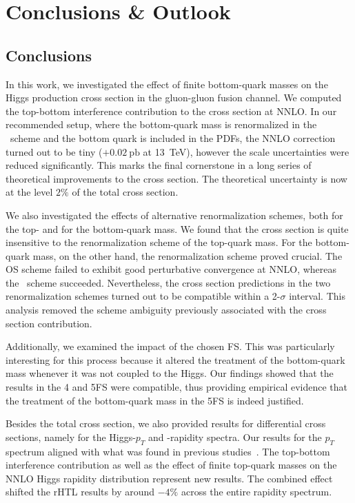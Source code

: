 

\chapter{Conclusions \& Outlook}\label{chap:seven}
\section{Conclusions}
In this work, we investigated the effect of finite bottom-quark masses on the Higgs production cross section in the gluon-gluon fusion channel. We computed the top-bottom interference contribution to the cross section at \acs{NNLO}. In our recommended setup, where the bottom-quark mass is renormalized in the \MS\ scheme and the bottom quark is included in the \acs{PDF}s, the \acs{NNLO} correction turned out to be tiny ($+0.02\ \mathrm{pb}$ at 13~TeV), however the scale uncertainties were reduced significantly. This marks the final cornerstone in a long series of theoretical improvements to the cross section. The theoretical uncertainty is now at the level $2\%$ of the total cross section.

We also investigated the effects of alternative renormalization schemes, both for the top- and for the bottom-quark mass. We found that the cross section is quite insensitive to the renormalization scheme of the top-quark mass. For the bottom-quark mass, on the other hand, the renormalization scheme proved crucial. The \acs{OS} scheme failed to exhibit good perturbative convergence at \acs{NNLO}, whereas the \MS\ scheme succeeded. Nevertheless, the cross section predictions in the two renormalization schemes turned out to be compatible within a 2-$\sigma$ interval. This analysis removed the scheme ambiguity previously associated with the cross section contribution.

Additionally, we examined the impact of the chosen \acs{FS}. This was particularly interesting for this process because it altered the treatment of the bottom-quark mass whenever it was not coupled to the Higgs. Our findings showed that the results in the 4 and 5\acs{FS} were compatible, thus providing empirical evidence that the treatment of the bottom-quark mass in the 5\acs{FS} is indeed justified.

Besides the total cross section, we also provided results for differential cross sections, namely for the Higgs-$p_T$ and -rapidity spectra. Our results for the $p_T$ spectrum aligned with what was found in previous studies~\cite{Caola:2018zye,Bonciani:2022jmb}. The top-bottom interference contribution as well as the effect of finite top-quark masses on the \acs{NNLO} Higgs rapidity distribution represent new results. The combined effect shifted the \acs{rHTL} results by around $-4\%$ across the entire rapidity spectrum.

